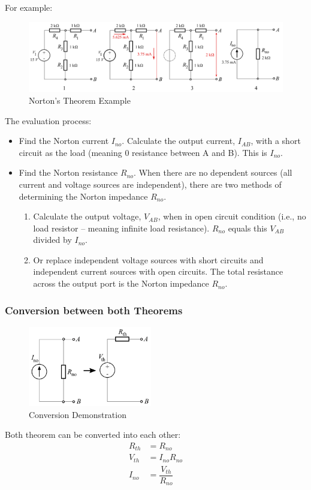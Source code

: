 \documentclass[UTF8]{article}
\begin{document}
For example:
\begin{figure}[H]
\centering
\includegraphics[width=\textwidth]{Norton-example.png}
\caption{Norton's Theorem Example}
\end{figure}

The evaluation process:
\begin{itemize}
\item Find the Norton current $I_{no}$. Calculate the output current, $I_{AB}$, with a short circuit as the load (meaning 0 resistance between A and B). This is $I_{no}$.
\item Find the Norton resistance $R_{no}$. When there are no dependent sources (all current and voltage sources are independent), there are two methods of determining the Norton impedance $R_{no}$.
\begin{enumerate}
\item Calculate the output voltage, $V_{AB}$, when in open circuit condition (i.e., no load resistor – meaning infinite load resistance). $R_{no}$ equals this $V_{AB}$ divided by $I_{no}$.
\item Or replace independent voltage sources with short circuits and independent current sources with open circuits. The total resistance across the output port is the Norton impedance $R_{no}$.
\end{enumerate}
\end{itemize}

\subsubsection{Conversion between both Theorems}
\begin{figure}
  \vspace{-50pt}
  \begin{center}
    \includegraphics[width=0.48\textwidth]{Norton-to-thevenin.png}
  \end{center}
  \vspace{-20pt}
  \caption{Conversion Demonstration}
  \vspace{-10pt}
\end{figure}
Both theorem can be converted into each other:
\begin{align*}
R_{th}&=R_{no}\\
V_{th}&=I_{no}R_{no}\\
I_{no}&=\dfrac{V_{th}}{R_{no}}
\end{align*}
\end{document}
